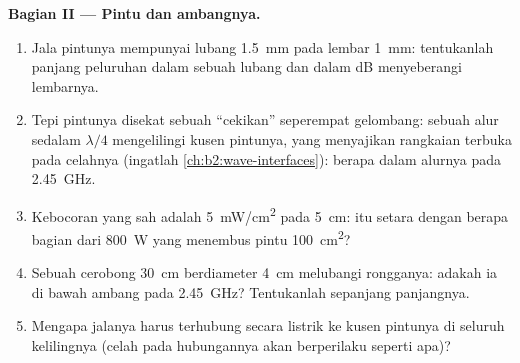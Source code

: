 \begin{problem}
\medskip
\noindent\textbf{Bagian II --- Pintu dan ambangnya.}
\begin{enumerate}[resume]
  \item Jala pintunya mempunyai lubang \qty{1.5}{mm} pada lembar \qty{1}{mm}: tentukanlah panjang
        peluruhan dalam sebuah lubang dan  dalam dB menyeberangi lembarnya.
  \item Tepi pintunya disekat sebuah ``cekikan'' seperempat gelombang: sebuah alur
        sedalam $\lambda/4$ mengelilingi kusen pintunya, yang menyajikan rangkaian
        terbuka pada celahnya (ingatlah \cref{ch:b2:wave-interfaces}): berapa dalam
        alurnya pada \qty{2.45}{GHz}.
  \item Kebocoran yang sah adalah \qty{5}{mW/cm^2} pada \qty{5}{cm}: itu setara dengan berapa bagian
        dari \qty{800}{W} yang menembus pintu \qty{100}{cm^2}?
  \item Sebuah cerobong \qty{30}{cm} berdiameter \qty{4}{cm} melubangi rongganya: adakah ia
        di bawah ambang pada \qty{2.45}{GHz}? Tentukanlah  sepanjang panjangnya.
  \item Mengapa jalanya harus terhubung secara listrik ke kusen pintunya di
        seluruh kelilingnya (celah pada hubungannya akan berperilaku seperti apa)?
\end{enumerate}


\end{problem}
